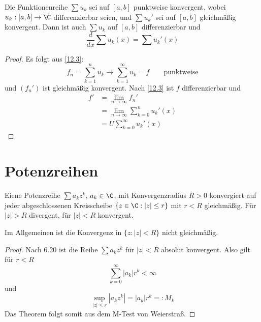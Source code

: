 \documentclass{mycourse}
\begin{document}
\setcounter{thm}{6}
\begin{st}
\label{12.7}
Die Funktionenreihe $\sum u_k$ sei auf $[a,b]$ punktweise konvergent, wobei
$u_k:[a,b]\to\C$ differenzierbar seien, und $\sum u_k'$ sei auf $[a,b]$ gleichmäßig konvergent.
Dann ist auch $\sum u_k$ auf $[a,b]$ differenzierbar und
\[
\frac d{dx}\sum u_k(x)=\sum u_k'(x)
\]
\begin{proof}
Es folgt aus \ref{12.3}:
\[
f_n=\sum_{k=1}^n u_k\longrightarrow \sum_{k=1}^\infty u_k=f \qquad \text{punktweise}
\]
und $(f_n')$ ist gleichmäßig konvergent.
Nach \ref{12.3} ist $f$ differenzierbar und
\begin{align*}
f'&=\lim_{n\to\infty} f_n' \\
&=\lim_{n\to\infty}\sum_{k=0}^n u_k'(x)\\
&=U\sum_{k=0}^\infty u_k'(x)
\end{align*}
\end{proof}
\end{st}

\section{Potenzreihen}

\begin{thm}
\label{12.9}
Eiene Potenzreihe $\sum a_kz^k$, $a_k\in\C$, mit Konvergenzradius $R>0$
konvergiert auf jeder abgeschlossenen Kreisscheibe $\{z\in\C:|z|\le r\}$ mit $r<R$ gleichmäßig.
Für $|z|>R$ divergent, für $|z|<R$ konvergent.
\begin{note}
Im Allgemeinen ist die Konvergenz in $\{z:|z|<R\}$ nicht gleichmäßig.
\end{note}
\begin{proof}
Nach 6.20 ist die Reihe $\sum a_kz^k$ für $|z|<R$ absolut konvergent.
Also gilt für $r<R$ 
\[
\sum_{k=0}^\infty |a_k|r^k < \infty
\]
und
\[
\sup_{|z|\le r}|a_kz^k| = |a_k|r^k =: M_k
\]
Das Theorem folgt somit aus dem M-Test von Weierstraß.
\end{proof}
\end{thm}
\end{document}
